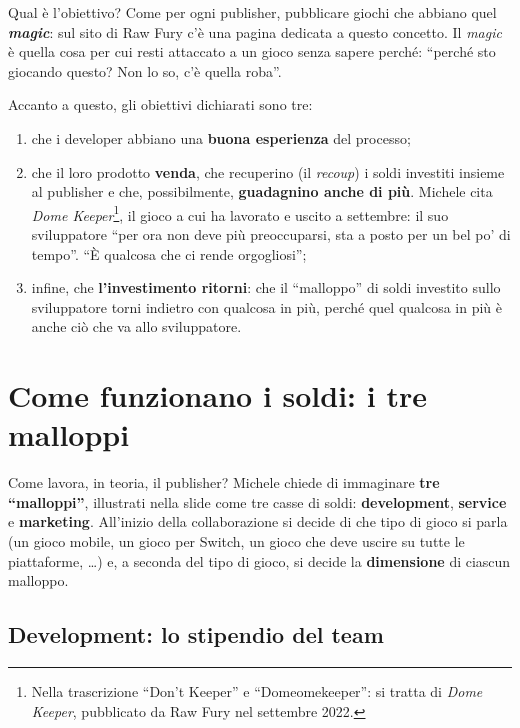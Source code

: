 Qual è l'obiettivo? Come per ogni publisher, pubblicare giochi che abbiano
quel \textbf{\emph{magic}}: sul sito di Raw Fury c'è una pagina dedicata a
questo concetto. Il \emph{magic} è quella cosa per cui resti attaccato a un
gioco senza sapere perché: ``perché sto giocando questo? Non lo so, c'è quella
roba''.

Accanto a questo, gli obiettivi dichiarati sono tre:
\begin{enumerate}
  \item che i developer abbiano una \textbf{buona esperienza} del processo;
  \item che il loro prodotto \textbf{venda}, che recuperino (il
        \emph{recoup}) i soldi investiti insieme al publisher e che,
        possibilmente, \textbf{guadagnino anche di più}. Michele cita
        \emph{Dome Keeper}\footnote{Nella trascrizione ``Don't Keeper'' e
        ``Domeomekeeper'': si tratta di \emph{Dome Keeper}, pubblicato da Raw
        Fury nel settembre 2022.}, il gioco a cui ha lavorato e uscito a
        settembre: il suo sviluppatore ``per ora non deve più preoccuparsi,
        sta a posto per un bel po' di tempo''. ``È qualcosa che ci rende
        orgogliosi'';
  \item infine, che \textbf{l'investimento ritorni}: che il ``malloppo'' di
        soldi investito sullo sviluppatore torni indietro con qualcosa in più,
        perché quel qualcosa in più è anche ciò che va allo sviluppatore.
\end{enumerate}

\section{Come funzionano i soldi: i tre malloppi}
\label{sec:z4-malloppi}

Come lavora, in teoria, il publisher? Michele chiede di immaginare
\textbf{tre ``malloppi''}, illustrati nella slide come tre casse di soldi:
\textbf{development}, \textbf{service} e \textbf{marketing}. All'inizio della
collaborazione si decide di che tipo di gioco si parla (un gioco mobile, un
gioco per Switch, un gioco che deve uscire su tutte le piattaforme, \dots) e,
a seconda del tipo di gioco, si decide la \textbf{dimensione} di ciascun
malloppo.

\subsection{Development: lo stipendio del team}

